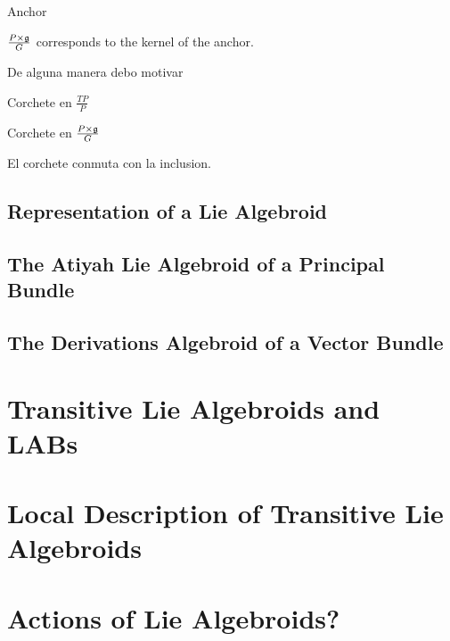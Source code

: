\begin{definition}
Anchor
\end{definition}

\begin{proposition}
$\frac{P \times \mathfrak{g}}{G}$ corresponds to the kernel of the anchor.
\end{proposition}

De alguna manera debo motivar 

\begin{definition}
Corchete en $\frac{TP}{P}$
\end{definition}

\begin{definition}
Corchete en $\frac{P \times \mathfrak{g}}{G}$
\end{definition}

\begin{proposition}
El corchete conmuta con la inclusion.
\end{proposition}




\subsection{Representation of a Lie Algebroid}

\subsection{The Atiyah Lie Algebroid of a Principal Bundle}

\subsection{The Derivations Algebroid of a Vector Bundle}

\section{Transitive Lie Algebroids and LABs}

\section{Local Description of Transitive Lie Algebroids}

\section{Actions of Lie Algebroids?}